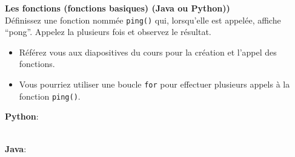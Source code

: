 \begin{Exercice}[5 minutes] \textbf{Les fonctions (fonctions basiques) (Java ou Python))}\\
  Définissez une fonction nommée \lstinline{ping()} qui, lorsqu'elle est appelée, affiche ``pong''. Appelez la plusieurs fois et observez le résultat.  \\
   
    \begin{conseil}
        \begin{itemize}
            \item Référez vous aux diapositives du cours pour la création et l'appel des fonctions. 
            \item Vous pourriez utiliser une boucle \lstinline{for} pour effectuer plusieurs appels à la fonction \lstinline{ping()}.
        \end{itemize}        
    \end{conseil}
    \begin{solution}
    
        \textbf{Python}:
        
        
        \textbf{\\Java}:
        
           
    \end{solution}   
\end{Exercice}

\begin{comment}
   \begin{Exercice}[5 minutes] \textbf{Les Fonctions (Fonction multiplication) (Java ou Python)}\\
   Définissez une fonction nommée \lstinline{multiplicateur()} qui prend deux arguments \textit{multiple\_1} et \textit{multiple\_2}, les multiplie et retourne le résultat. Stockez le résultat de \lstinline{multiplicateur(2,3)} dans une variable \textit{resultat} et affichez la.   \\
   
    \begin{conseil}
        \begin{itemize}
            \item Référez vous au cours pour la création et l'appel des fonctions.
            \item Pour retourner une valeur au lieu de l'imprimer, utilisez le mot clé \lstinline{return} (pour Python et Java).
        \end{itemize}        
    \end{conseil}
    \begin{solution}
        \textbf{Python}:
        
        
        \textbf{\\Java}:
        
    \end{solution}   
\end{Exercice} 
\end{comment}

